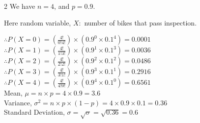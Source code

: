 \begin{multicols}{2}
We have $n=4$, and $p=0.9$.

Here random variable, $X:$ number of bikes that pass inspection.

$\therefore P(X=0) = \left(\frac{4!}{0!4!}\right) \times \left(0.9^0 \times 0.1^4\right) = 0.0001$ \\[0.5em]
$\therefore P(X=1) = \left(\frac{4!}{1!3!}\right) \times \left(0.9^1 \times 0.1^3\right) = 0.0036$ \\[0.5em]
$\therefore P(X=2) = \left(\frac{4!}{2!2!}\right) \times \left(0.9^2 \times 0.1^2\right) = 0.0486$ \\[0.5em]
$\therefore P(X=3) = \left(\frac{4!}{3!1!}\right) \times \left(0.9^3 \times 0.1^1\right) = 0.2916$ \\[0.5em]
$\therefore P(X=4) = \left(\frac{4!}{4!0!}\right) \times \left(0.9^4 \times 0.1^0\right) = 0.6561$ \\[0.5em]

Mean, $\mu = n \times p = 4 \times 0.9 = 3.6$ \\[0.75em]
Variance, $\sigma^2 = n \times p \times (1-p) = 4 \times 0.9 \times 0.1 = 0.36$ \\[0.75em]
Standard Deviation, $\sigma = \sqrt{\sigma} = \sqrt{0.36} = 0.6$
\vfill\null
\end{multicols}
